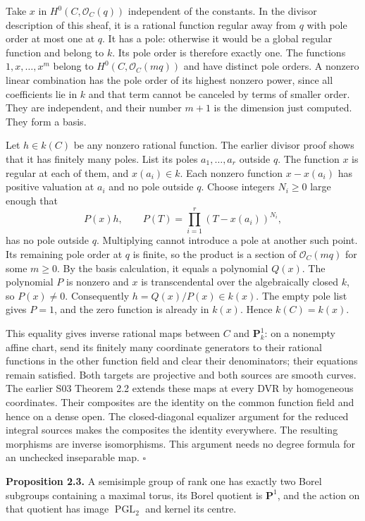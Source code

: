 \documentclass[11pt,a4paper,openany]{report}
\newcounter{none}
\begin{document}
Take \(x\) in \(H^0(C,\mathcal O_C(q))\) independent of the constants. In the divisor description of this sheaf, it is a rational function regular away from \(q\) with pole order at most one at \(q\). It has a pole: otherwise it would be a global regular function and belong to \(k\). Its pole order is therefore exactly one. The functions \(1,x,\ldots,x^m\) belong to \(H^0(C,\mathcal O_C(mq))\) and have distinct pole orders. A nonzero linear combination has the pole order of its highest nonzero power, since all coefficients lie in \(k\) and that term cannot be canceled by terms of smaller order. They are independent, and their number \(m+1\) is the dimension just computed. They form a basis.

Let \(h\in k(C)\) be any nonzero rational function. The earlier divisor proof shows that it has finitely many poles. List its poles \(a_1,\ldots,a_r\) outside \(q\). The function \(x\) is regular at each of them, and \(x(a_i)\in k\). Each nonzero function \(x-x(a_i)\) has positive valuation at \(a_i\) and no pole outside \(q\). Choose integers \(N_i\ge0\) large enough that \[
 P(x)h,\qquad P(T)=\prod_{i=1}^r(T-x(a_i))^{N_i},
\] has no pole outside \(q\). Multiplying cannot introduce a pole at another such point. Its remaining pole order at \(q\) is finite, so the product is a section of \(\mathcal O_C(mq)\) for some \(m\ge0\). By the basis calculation, it equals a polynomial \(Q(x)\). The polynomial \(P\) is nonzero and \(x\) is transcendental over the algebraically closed \(k\), so \(P(x)\ne0\). Consequently \(h=Q(x)/P(x)\in k(x)\). The empty pole list gives \(P=1\), and the zero function is already in \(k(x)\). Hence \(k(C)=k(x)\).

This equality gives inverse rational maps between \(C\) and \(\mathbf P^1_k\): on a nonempty affine chart, send its finitely many coordinate generators to their rational functions in the other function field and clear their denominators; their equations remain satisfied. Both targets are projective and both sources are smooth curves. The earlier S03 Theorem 2.2 extends these maps at every DVR by homogeneous coordinates. Their composites are the identity on the common function field and hence on a dense open. The closed-diagonal equalizer argument for the reduced integral sources makes the composites the identity everywhere. The resulting morphisms are inverse isomorphisms. This argument needs no degree formula for an unchecked inseparable map. \(\square\)

\textbf{Proposition 2.3.} A semisimple group of rank one has exactly two Borel subgroups containing a maximal torus, its Borel quotient is \(\mathbf P^1\), and the action on that quotient has image \(\operatorname{PGL}_2\) and kernel its centre.
\end{document}
